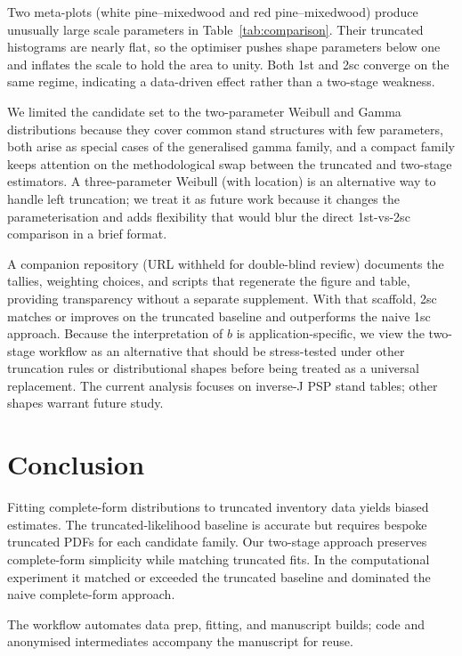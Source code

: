 \documentclass[12pt]{article}
\begin{document}
Two meta-plots (white pine--mixedwood and red pine--mixedwood) produce unusually large scale parameters in Table~\ref{tab:comparison}. Their truncated histograms are nearly flat, so the optimiser pushes shape parameters below one and inflates the scale to hold the area to unity. Both 1st and 2sc converge on the same regime, indicating a data-driven effect rather than a two-stage weakness.

We limited the candidate set to the two-parameter Weibull and Gamma distributions because they cover common stand structures with few parameters, both arise as special cases of the generalised gamma family, and a compact family keeps attention on the methodological swap between the truncated and two-stage estimators. A three-parameter Weibull (with location) is an alternative way to handle left truncation; we treat it as future work because it changes the parameterisation and adds flexibility that would blur the direct 1st-vs-2sc comparison in a brief format.

A companion repository (URL withheld for double-blind review) documents the tallies, weighting choices, and scripts that regenerate the figure and table, providing transparency without a separate supplement. With that scaffold, 2sc matches or improves on the truncated baseline and outperforms the naive 1sc approach. Because the interpretation of $b$ is application-specific, we view the two-stage workflow as an alternative that should be stress-tested under other truncation rules or distributional shapes before being treated as a universal replacement. The current analysis focuses on inverse-J PSP stand tables; other shapes warrant future study.

\section{Conclusion}

\label{sec:conclusion}

Fitting complete-form distributions to truncated inventory data yields biased estimates. The truncated-likelihood baseline is accurate but requires bespoke truncated PDFs for each candidate family. Our two-stage approach preserves complete-form simplicity while matching truncated fits. In the computational experiment it matched or exceeded the truncated baseline and dominated the naive complete-form approach.

The workflow automates data prep, fitting, and manuscript builds; code and anonymised intermediates accompany the manuscript for reuse.
\end{document}

